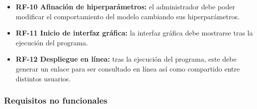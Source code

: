 \begin{itemize}
  \item \textbf{RF-10 Afinación de hiperparámetros:} el administrador debe poder modificar el comportamiento del modelo cambiando sus hiperparámetros.

  \item \textbf{RF-11 Inicio de interfaz gráfica:} la interfaz gráfica debe mostrarse tras la ejecución del programa.

  \item \textbf{RF-12 Despliegue en línea:} tras la ejecución del programa, este debe generar un enlace para ser consultado en línea así como compartido entre distintos usuarios.
  
\end{itemize}

\subsubsection{Requisitos no funcionales}

